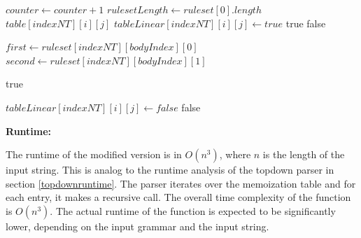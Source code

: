 \documentclass[a4paper, 11pt]{article}
\begin{document}
\begin{center}
\begin{algorithmic}[1]
\State $counter \gets counter+1$
\State $rulesetLength \gets ruleset[0].length$
	\State \Return $table[indexNT][i][j]$
\EndIf
{}
		\State $tableLinear[indexNT][i][j] \gets true$
		\State \Return true
	\EndIf
	\EndFor
	\State \Return false
\EndIf 

		\State $first \gets ruleset[indexNT][bodyIndex][0]$
		\State $second \gets ruleset[indexNT][bodyIndex][1]$
			\EndIf
			\EndIf
		\EndFor
	\EndIf
\EndFor

	\State \Return true
\EndIf

\State $tableLinear[indexNT][i][j] \gets false$
\State \Return false
\end{algorithmic}
\hrulefill
\end{center}


\label{lineartopdown_runtime}
\textbf{Runtime:}

The runtime of the modified version is in $O(n^3)$, where $n$ is the length of the input string. This is analog to the runtime analysis of the topdown parser in section \ref{topdownruntime}.
The parser iterates over the memoization table and for each entry, it makes a recursive call. The overall time complexity of the function is $O(n^3)$.
The actual runtime of the function is expected to be significantly lower, depending on the input grammar and the input string. 
\end{document}
